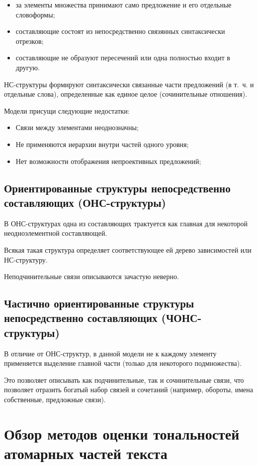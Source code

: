 \documentclass[a4paper,14pt,russian]{extreport}
\begin{document}
\begin{itemize}
\item за элементы множества принимают само предложение и его отдельные словоформы;
\item составляющие состоят из непосредственно связянных синтаксически отрезков;
\item составляющие не образуют пересечений или одна полностью входит в другую.
\end{itemize}

НС-структуры формируют синтаксически связанные части предложений (в т.~ч. и отдельные слова), определенные как единое целое (сочинительные отношения).

Модели присущи следующие недостатки:

\begin{itemize}
\item Связи между элементами неоднозначны;
\item Не применяются иерархии внутри частей одного уровня;
\item Нет возможности отображения непроективных предложений;
\end{itemize}
\subsection{Ориентированные структуры непосредственно составляющих (ОНС-структуры)}
В ОНС-структурах одна из составляющих трактуется как главная для некоторой неодноэлементной составляющей.

Всякая такая структура определяет соответствующее ей дерево зависимостей или НС-структуру.

Неподчинительные связи описываются зачастую неверно.
\subsection{Частично ориентированные структуры непосредственно составляющих (ЧОНС-структуры)}
В отличие от ОНС-структур, в данной модели не к каждому элементу применяется выделение главной части (только для некоторого подмножества).

Это позволяет описывать как подчинительные, так и сочинительные связи, что позволяет отразить богатый набор связей и сочетаний (например, обороты, имена собственные, предложные связи).
\section{Обзор методов оценки тональностей атомарных частей текста}
\end{document}
